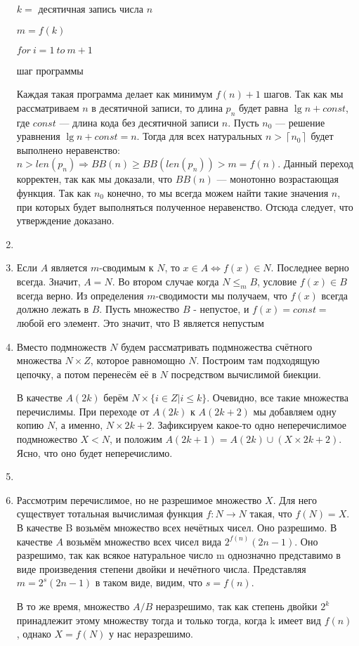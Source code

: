 \documentclass[11pt]{article}
\begin{document}
\begin{enumerate}
		$k =$ десятичная запись числа $n$
		
		$m = f(k)$
		
		$for \: i = 1\: to \: m + 1 $
		
		шаг программы
		
		Каждая такая программа делает как минимум $f(n) + 1$ шагов.
		Так как мы рассматриваем $n$ в десятичной записи, то длина $p_n$ будет равна $\lg n + const$, где $const$ {{---}} длина кода без десятичной записи $n$. Пусть $n_0$ {{---}} решение уравнения $\lg n + const = n$. Тогда для всех натуральных $ n > \left \lceil n_0 \right \rceil $ будет выполнено неравенство: $ n > len(p_n) \Rightarrow BB(n) \geqslant BB(len(p_n)) > m = f(n) $. Данный переход корректен, так как мы доказали, что $BB(n)$ {{---}} монотонно возрастающая функция. Так как $n_0$ конечно, то мы всегда можем найти такие значения $n$, при которых будет выполняться полученное неравенство. Отсюда следует, что утверждение доказано.
		\item
		\item Если $A$ является $m$-сводимым к $N$, то $x \in A \Leftrightarrow f(x) \in N$. Последнее верно всегда. Значит, $A=N$. Во втором случае когда $N \le_m B$, условие $f(x) \in B$ всегда верно. Из определения $m$-сводимости мы получаем, что $f(x)$ всегда должно лежать в $B$. Пусть множество $B$ - непустое, и $f(x) = const =$ любой его элемент. Это значит, что B является непустым
		\item Вместо подмножеств $N$ будем рассматривать подмножества счётного множества $N \times Z$, которое равномощно $N$. Построим там подходящую цепочку, а потом перенесём её в $N$ посредством вычислимой биекции.
		
		В качестве $A(2k)$ берём $N \times \{i \in Z | i\le k\}$. Очевидно, все такие множества перечислимы. При переходе от $A(2k)$ к $A(2k+2)$ мы добавляем одну копию $N$, а именно, $N \times {2k+2}$. Зафиксируем какое-то одно неперечислимое подмножество $X < N$, и положим $A(2k+1) = A(2k) \cup (X \times {2k+2})$. Ясно, что оно будет неперечислимо.
		
		\item
		\item Рассмотрим перечислимое, но не разрешимое множество $X$. Для него существует тотальная вычислимая функция $f:N\to N$ такая, что $f(N)=X$. В качестве B возьмём множество всех нечётных чисел. Оно разрешимо. В качестве $A$ возьмём множество всех чисел вида $2^{f(n)}(2n-1)$. Оно разрешимо, так как всякое натуральное число m однозначно представимо в виде произведения степени двойки и нечётного числа. Представляя $m=2^s(2n-1)$ в таком виде, видим, что $s=f(n)$.
		
		В то же время, множество $A/B$ неразрешимо, так как степень двойки $2^k$ принадлежит этому множеству тогда и только тогда, когда k имеет вид $f(n)$, однако $X=f(N)$ у нас неразрешимо.
		
	\end{enumerate}
\end{document}
